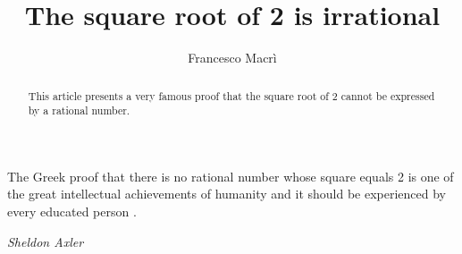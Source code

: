 \documentclass[11pt]{amsart}
\theoremstyle{definition}
\begin{document}
\epigraph{The Greek proof that there is no rational number whose square equals 2 is one of the great intellectual achievements of humanity and it should be experienced by every educated person \cite[4]{axlerAlgebraTrigonometryStudent2012}.} {\textit{Sheldon Axler}}
\title{The square root of 2 is irrational}
\author{Francesco Macrì }
\begin{abstract}
    This article presents a very famous proof that the square root of 2 cannot be expressed by a rational number.
\end{abstract}
\maketitle
\noindent{}
\end{document}
